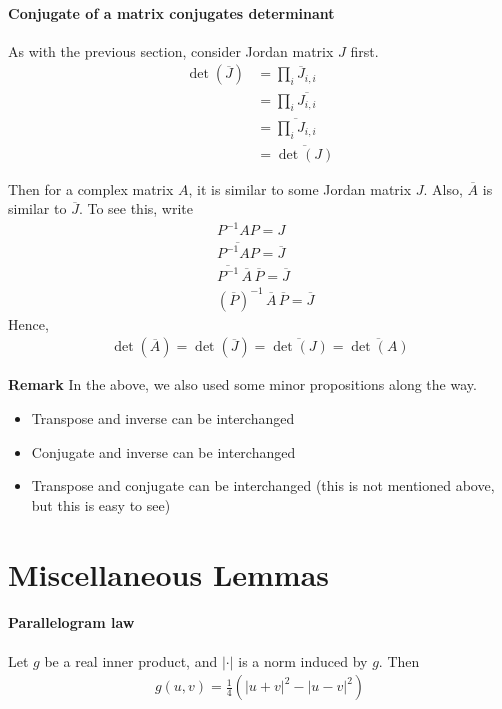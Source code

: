 \documentclass{article}
\begin{document}
\paragraph{Conjugate of a matrix conjugates determinant}
As with the previous section, consider Jordan matrix $J$ first.
\begin{align*}
	\det(\overline{J})
	&=\prod_i\overline{J}_{i,i}\\
	&=\prod_i\overline{J_{i,i}}\\
	&=\overline{\prod_iJ_{i,i}}\\
	&=\overline{\det(J)}
\end{align*}

Then for a complex matrix $A$, it is similar to some Jordan matrix $J$. Also, $\overline{A}$ is similar to $\overline{J}$.
To see this, write
\begin{align*}
	&P^{-1}AP=J\\
	&\overline{P^{-1}AP}=\overline{J}\\
	&\overline{P^{-1}}\,\overline{A}\,\overline{P}=\overline{J}\\
	&(\overline{P})^{-1}\, \overline{A}\, \overline{P}=\overline{J}
\end{align*}
Hence,
\begin{align*}
	\det(\overline{A}) = \det(\overline{J}) = \overline{\det(J)} = \overline{\det(A)}
\end{align*}

\textbf{Remark} In the above, we also used some minor propositions along the way. 
\begin{itemize}
	\item Transpose and inverse can be interchanged
	\item Conjugate and inverse can be interchanged
	\item Transpose and conjugate can be interchanged (this is not mentioned above, but this is easy to see)
\end{itemize}

\section{Miscellaneous Lemmas}

\paragraph{Parallelogram law} Let $g$ be a real inner product, and $|\cdot|$ is a norm induced by $g$. Then 
\begin{align*}
	g(u,v) = \frac{1}{4}(|u+v|^2-|u-v|^2)
\end{align*}
\end{document}
